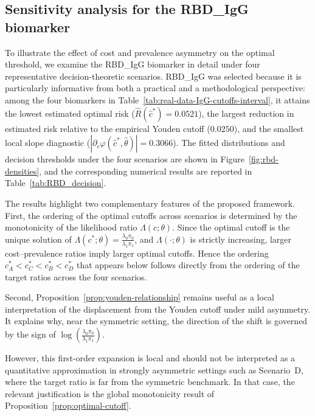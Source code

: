 \documentclass[11pt,a4paper]{article}
\theoremstyle{definition}
\theoremstyle{remark}
\newcommand{\1}{\mathbf{1}}
\begin{document}
\subsection{Sensitivity analysis for the RBD\_IgG biomarker}

To illustrate the effect of cost and prevalence asymmetry on
the optimal threshold, we examine the RBD\_IgG biomarker in
detail under four representative decision-theoretic
scenarios.
RBD\_IgG was selected because it is particularly informative
from both a practical and a methodological perspective:
among the four biomarkers in
Table~\ref{tab:real-data-IgG-cutoffs-interval}, it attains
the lowest estimated optimal risk
($\widehat R(\hat c^*)=0.0521$), the largest reduction in
estimated risk relative to the empirical Youden cutoff
($0.0250$), and the smallest local slope diagnostic
($|\partial_c\varphi(\hat c^*,\hat\theta)|=0.3066$).
The fitted distributions and decision thresholds under the
four scenarios are shown in
Figure~\ref{fig:rbd-densities}, and the corresponding
numerical results are reported in
Table~\ref{tab:RBD_decision}.

The results highlight two complementary features of the
proposed framework.
First, the ordering of the optimal cutoffs across scenarios
is determined by the monotonicity of the likelihood ratio
$\Lambda(c;\theta)$.
Since the optimal cutoff is the unique solution of
$\Lambda(c^*;\theta)=\frac{\lambda_0\pi_0}{\lambda_1\pi_1}$,
and $\Lambda(\cdot;\theta)$ is strictly increasing, larger
cost--prevalence ratios imply larger optimal cutoffs.
Hence the ordering $c_A^*<c_C^*<c_B^*<c_D^*$ that appears below
follows directly from the ordering of the target ratios
across the four scenarios.

Second, Proposition~\ref{prop:youden-relationship} remains
useful as a local interpretation of the displacement from
the Youden cutoff under mild asymmetry.
It explains why, near the symmetric setting, the direction
of the shift is governed by the sign of
$\log\!\left(\frac{\lambda_0\pi_0}{\lambda_1\pi_1}\right)$.

However, this first-order expansion is local and should not
be interpreted as a quantitative approximation in strongly
asymmetric settings such as Scenario~D, where the target
ratio is far from the symmetric benchmark.
In that case, the relevant justification is the global
monotonicity result of
Proposition~\ref{prop:optimal-cutoff}.
\end{document}
